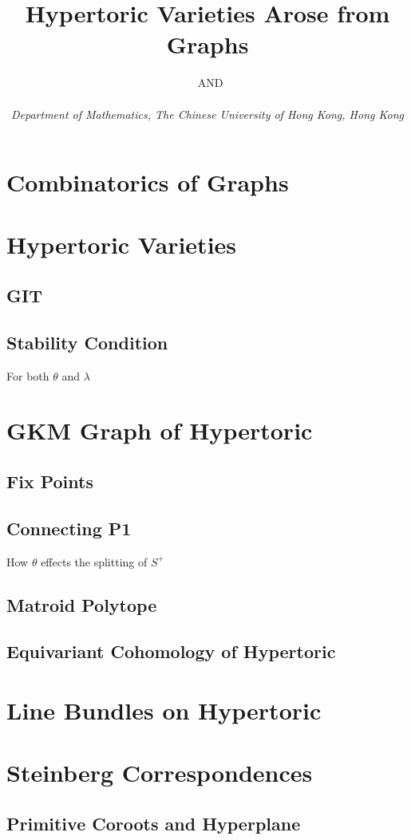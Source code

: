 \documentclass[b5paper,final]{article}
\title{\bf{
Hypertoric Varieties Arose from Graphs
}}
\author{\ansonlaw\ {\small{AND}} \omegat\\\\
\emph{Department of Mathematics, The Chinese University of Hong Kong, Hong Kong}
}
\date{}
\begin{document}
\maketitle
\vspace{-3.5em}
%

\thispagestyle{empty}
\tableofcontents
\listoftodos

\newpage
\section{Combinatorics of Graphs}
\section{Hypertoric Varieties}
\subsection{GIT}
\subsection{Stability Condition}
For both $\theta$ and $\lambda$
\section{GKM Graph of Hypertoric}
\subsection{Fix Points}
\subsection{Connecting P1}
How $\theta$ effects the splitting of $S^+$
\subsection{Matroid Polytope}
\subsection{Equivariant Cohomology of Hypertoric}
\section{Line Bundles on Hypertoric}
\section{Steinberg Correspondences}
\subsection{Primitive Coroots and Hyperplane}
\end{document}
